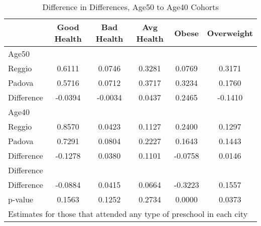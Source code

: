\begin{table}[htbp]\centering
\caption{Difference in Differences, Age50 to Age40 Cohorts}
\begin{tabular}{l*{5}{c}}
\hline\hline
            & Good Health&  Bad Health&  Avg Health&       Obese&  Overweight\\
\hline
Age50       &            &            &            &            &            \\
Reggio      &      0.6111&      0.0746&      0.3281&      0.0769&      0.3171\\
Padova      &      0.5716&      0.0712&      0.3717&      0.3234&      0.1760\\
Difference  &     -0.0394&     -0.0034&      0.0437&      0.2465&     -0.1410\\
\hline
Age40       &            &            &            &            &            \\
Reggio      &      0.8570&      0.0423&      0.1127&      0.2400&      0.1297\\
Padova      &      0.7291&      0.0804&      0.2227&      0.1643&      0.1443\\
Difference  &     -0.1278&      0.0380&      0.1101&     -0.0758&      0.0146\\
\hline
Difference  &            &            &            &            &            \\
Difference  &     -0.0884&      0.0415&      0.0664&     -0.3223&      0.1557\\
p-value     &      0.1563&      0.1252&      0.2734&      0.0000&      0.0373\\
\hline\hline
\multicolumn{6}{l}{\footnotesize Estimates for those that attended any type of preschool in each city}\\
\end{tabular}
\end{table}
